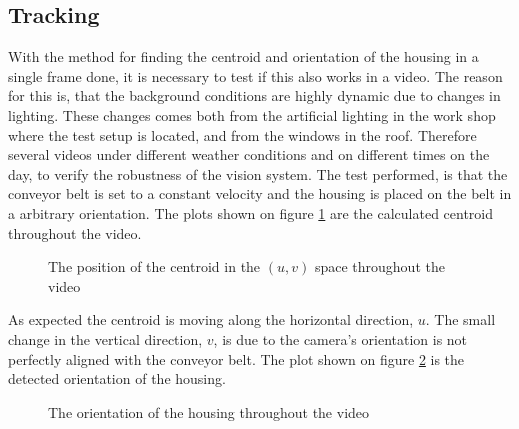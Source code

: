 \subsection{Tracking} 
With the method for finding the centroid and orientation of the housing in a single frame done, it is necessary to test if this also works in a video. The reason for this is, that the background conditions are highly dynamic due to changes in lighting. These changes comes both from the artificial lighting in the work shop where the test setup is located, and from the windows in the roof. Therefore several videos under different weather conditions and on different times on the day, to verify the robustness of the vision system. The test performed, is that the conveyor belt is set to a constant velocity and the housing is placed on the belt in a arbitrary orientation. The plots shown on figure \ref{fig_vid_pos} are the calculated centroid throughout the video.\clearpage
\begin{figure}[htbp!]
\centering
{}
\caption{The position of the centroid in the $(u,v)$ space throughout the video}
\label{fig_vid_pos}
\end{figure}
\noindent As expected the centroid is moving along the horizontal direction, $u$. The small change in the vertical direction, $v$, is due to the camera's orientation is not perfectly aligned with the conveyor belt.  The plot shown on figure \ref{fig_vid_ori} is the detected orientation of the housing.
\begin{figure}[htpb!]
	\centering
	\caption{The orientation of the housing throughout the video}
	\label{fig_vid_ori}
\end{figure}\\
